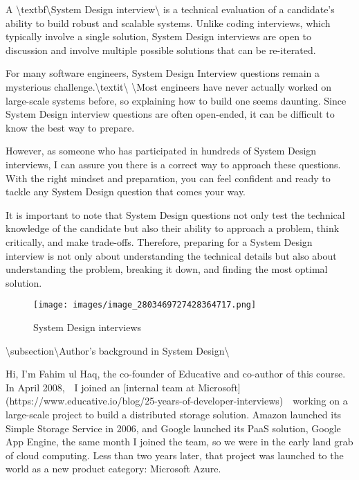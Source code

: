 

A \textbackslash{}textbf\textbackslash{}{System Design interview\textbackslash{}} is a technical evaluation of a candidate’s ability to build robust and scalable systems. Unlike coding interviews, which typically involve a single solution, System Design interviews are open to discussion and involve multiple possible solutions that can be re-iterated.

For many software engineers, System Design Interview questions remain a mysterious challenge.\textbackslash{}textit\textbackslash{}{ \textbackslash{}}Most engineers have never actually worked on large-scale systems before, so explaining how to build one seems daunting. Since System Design interview questions are often open-ended, it can be difficult to know the best way to prepare.

However, as someone who has participated in hundreds of System Design interviews, I can assure you there is a correct way to approach these questions. With the right mindset and preparation, you can feel confident and ready to tackle any System Design question that comes your way.

It is important to note that System Design questions not only test the technical knowledge of the candidate but also their ability to approach a problem, think critically, and make trade-offs. Therefore, preparing for a System Design interview is not only about understanding the technical details but also about understanding the problem, breaking it down, and finding the most optimal solution.

\begin{figure}[htbp]
    \centering
    \texttt{[image: images/image\_2803469727428364717.png]}
    \caption{System Design interviews}
\end{figure}

\textbackslash{}subsection\textbackslash{}{Author’s background in System Design\textbackslash{}}

Hi, I’m Fahim ul Haq, the co-founder of Educative and co-author of this course. In April 2008,  I joined an [internal team at Microsoft](https://www.educative.io/blog/25-years-of-developer-interviews)  working on a large-scale project to build a distributed storage solution. Amazon launched its Simple Storage Service in 2006, and Google launched its PaaS solution, Google App Engine, the same month I joined the team, so we were in the early land grab of cloud computing. Less than two years later, that project was launched to the world as a new product category: Microsoft Azure.

